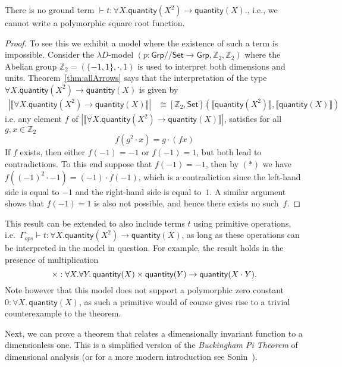 \documentclass[a4paper,UKenglish]{lipics}
\theoremstyle{plain}
\newcommand{\msf}[1]{\mathsf{#1}} %
\newcommand{\Grp}{\msf{Grp}}
\newcommand{\Set}{\msf{Set}}
\newcommand{\GroupSet}[1]{[#1,\Set]}
\newcommand{\Lslice}[1]{#1/\!/\Set}
\newcommand{\GrpSet}{\Lslice{\Grp}}
\newcommand{\bbZ}{\mathbb{Z}}
\newcommand{\sem}[1]{\ensuremath{\llbracket #1 \rrbracket}}
\newcommand{\qnt}{\msf{quantity}}
\newcommand{\Gammaops}{\ensuremath{\Gamma_{ops}}}
\newcommand{\Dvar}{X}
\begin{document}
\begin{theorem}
\label{thm:UninhabType}
 There is no ground term  $\vdash t : \forall X . \qnt(X^2) \rightarrow \qnt(X)$., i.e., we cannot write a polymorphic square root function.
\end{theorem}
\begin{proof}
To see this we exhibit a model where the existence of such a term is impossible. Consider the $\lambda D$-model $(p:\GrpSet \rightarrow \Grp, \mathbb{Z}_2, \mathbb{Z}_2)$  where the Abelian group $\mathbb{Z}_2 = (\{ -1, 1\},\cdot,1)$ is used to interpret both dimensions and units. Theorem~\ref{thm:allArrows} says that the interpretation of the type $\forall X . \qnt(X^2) \rightarrow \qnt(X)$ is given by
\begin{align*}
  |\sem{\forall X . \qnt(X^2) \rightarrow \qnt(X)}|  &  \cong \GroupSet{\mathbb{Z}_2} (\sem{\qnt (X^2)}, \sem{\qnt(X)})
\end{align*}
i.e. any element $f$ of $ |\sem{\forall X . \qnt(X^2) \rightarrow \qnt(X)}|$, satisfies for all $g, x \in \bbZ_2$
\begin{equation}
f (g^2 \cdot x) = g \cdot (fx) \tag{$\ast$}
\end{equation}
If $f$ exists, then either $f(-1) = -1$ or $f(-1) = 1$, but both lead to contradictions. To this end suppose that $f(-1) = -1$, then by $(\ast)$
we have
$f((-1)^2 \cdot -1) = (-1) \cdot f(-1)$,
which is a contradiction since the left-hand side is equal to $-1$ and the right-hand side is equal to~$1$. A similar argument shows that $f(-1)=1$ is also not possible, and hence there exists no such~$f$.
\end{proof}

This result can be extended to also include terms $t$ using primitive
operations, i.e.\ $\Gammaops \vdash t : \forall X . \qnt(X^2)
\rightarrow \qnt(X)$, as long as these operations can be interpreted
in the model in question.
For example, the result holds in the presence of multiplication
\[\times:\forall X.\forall Y.\,\qnt(X)\times\qnt (Y)\to\qnt(X\cdot Y)\text.\]
Note however that this model does not
support a polymorphic zero constant $0 : \forall \Dvar
.\, \qnt(\Dvar)$, as such a primitive would of course gives rise
to a trivial counterexample to the theorem.

Next, we can prove a theorem that relates a dimensionally invariant function to a dimensionless one. This is a simplified version of the \emph{Buckingham Pi Theorem} of dimensional analysis \cite{buckingham1914physically} (or for a more modern introduction see Sonin~\cite{sonin2001physical}).
\end{document}
